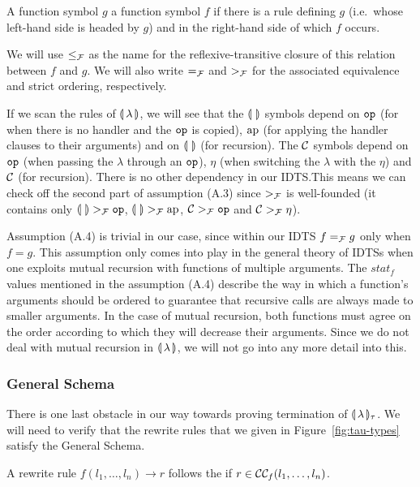 \begin{definition}
  A function symbol $g$  a function symbol $f$ if there
  is a rule defining $g$ (i.e.\ whose left-hand side is headed by $g$) and
  in the right-hand side of which $f$ occurs.

  We will use $\le_{\mathcal{F}}$ as the name for the reflexive-transitive closure of
  this relation between $f$ and $g$. We will also write $=_{\mathcal{F}}$ and $>_{\mathcal{F}}$
  for the associated equivalence and strict ordering, respectively.
\end{definition}

If we scan the rules of $\llparenthesis \, \lambda \, \rrparenthesis$, we will see that the
$\llparenthesis \,  \, \rrparenthesis$ symbols depend on $\mathtt{op}$ (for when there is no handler and
the $\mathtt{op}$ is copied), $\operatorname{ap}$ (for applying the handler clauses to their
arguments) and on $\llparenthesis \,  \, \rrparenthesis$ (for recursion). The $\mathcal{C}$ symbols depend on
$\mathtt{op}$ (when passing the $\lambda$ through an $\mathtt{op}$), $\eta$ (when
switching the $\lambda$ with the $\eta$) and $\mathcal{C}$ (for recursion). There
is no other dependency in our IDTS.\@ This means we can check off the
second part of assumption (A.3) since $>_{\mathcal{F}}$ is well-founded (it contains
only $\llparenthesis \,  \, \rrparenthesis >_{\mathcal{F}} \mathtt{op}$, $\llparenthesis \,  \, \rrparenthesis >_{\mathcal{F}} \operatorname{ap}$, $\mathcal{C} >_{\mathcal{F}} \mathtt{op}$
and $\mathcal{C} >_{\mathcal{F}} \eta$).

Assumption (A.4) is trivial in our case, since within our IDTS $f =_{\mathcal{F}} g$
only when $f = g$. This assumption only comes into play in the general
theory of IDTSs when one exploits mutual recursion with functions of
multiple arguments. The $stat_f$ values mentioned in the assumption (A.4)
describe the way in which a function's arguments should be ordered to
guarantee that recursive calls are always made to smaller arguments. In the
case of mutual recursion, both functions must agree on the order according
to which they will decrease their arguments. Since we do not deal with
mutual recursion in $\llparenthesis \, \lambda \, \rrparenthesis$, we will not go into any more detail
into this.


\subsubsection{General Schema}

There is one last obstacle in our way towards proving termination of
$\llparenthesis \, \lambda \, \rrparenthesis_\tau$. We will need to verify that the rewrite rules that
we given in Figure~\ref{fig:tau-types} satisfy the General Schema.

\begin{definition}
  A rewrite rule $f(l_1, \ldots, l_n) \to r$ follows the  if $r \in \mathcal{C}\mathcal{C}_f(l_1, \ldots, l_n)$.
\end{definition}

